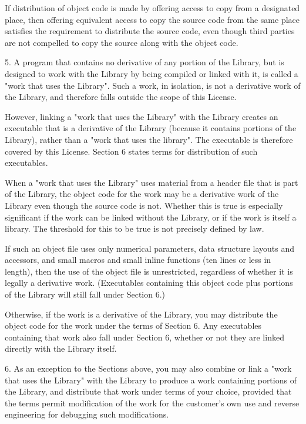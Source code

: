 If distribution of object code is made by offering access to copy from a
designated place, then offering equivalent access to copy the source code
from the same place satisfies the requirement to distribute the source code,
even though third parties are not compelled to copy the source along with the
object code.

5. A program that contains no derivative of any portion of the Library, but
is designed to work with the Library by being compiled or linked with it, is
called a "work that uses the Library".  Such a work, in isolation, is not a
derivative work of the Library, and therefore falls outside the scope of this
License.

However, linking a "work that uses the Library" with the Library creates an
executable that is a derivative of the Library (because it contains portions
of the Library), rather than a "work that uses the library".  The executable
is therefore covered by this License.  Section 6 states terms for
distribution of such executables.

When a "work that uses the Library" uses material from a header file that is
part of the Library, the object code for the work may be a derivative work of
the Library even though the source code is not.  Whether this is true is
especially significant if the work can be linked without the Library, or if
the work is itself a library.  The threshold for this to be true is not
precisely defined by law.

If such an object file uses only numerical parameters, data structure layouts
and accessors, and small macros and small inline functions (ten lines or less
in length), then the use of the object file is unrestricted, regardless of
whether it is legally a derivative work.  (Executables containing this object
code plus portions of the Library will still fall under Section 6.)

Otherwise, if the work is a derivative of the Library, you may distribute the
object code for the work under the terms of Section 6.  Any executables
containing that work also fall under Section 6, whether or not they are
linked directly with the Library itself.

6. As an exception to the Sections above, you may also combine or link a
"work that uses the Library" with the Library to produce a work containing
portions of the Library, and distribute that work under terms of your choice,
provided that the terms permit modification of the work for the customer's
own use and reverse engineering for debugging such modifications.

